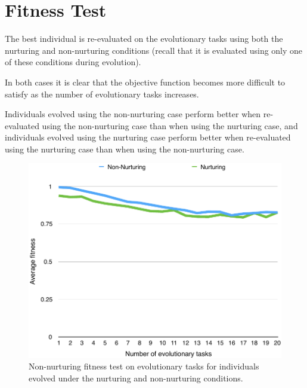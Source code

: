 \documentclass[master]{outhesis}
\begin{document}
\section{Fitness Test}

The best individual is re-evaluated on the evolutionary tasks using both the nurturing and non-nurturing conditions (recall that it is evaluated using only one of these conditions during evolution).

In both cases it is clear that the objective function becomes more difficult to satisfy as the number of evolutionary tasks increases. 

Individuals evolved using the non-nurturing case perform better when re-evaluated using the non-nurturing case than when using the nurturing case, and individuals evolved using the nurturing case perform better when re-evaluated using the nurturing case than when using the non-nurturing case.

\begin{figure}[H]
	\centering
	\includegraphics{NonNurturingFitnessTestPlot.pdf}
	\caption{Non-nurturing fitness test on evolutionary tasks for individuals evolved under the nurturing and non-nurturing conditions.}
\end{figure}
\end{document}
